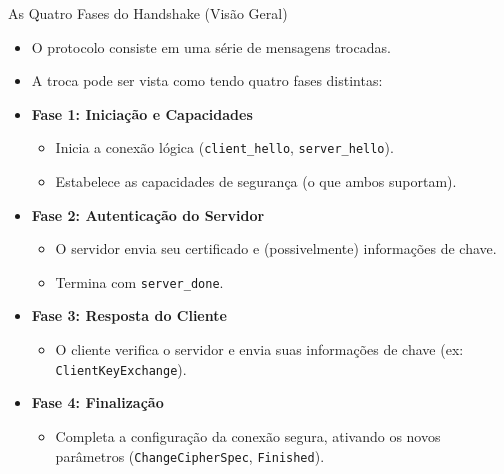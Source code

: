 \begin{frame}{As Quatro Fases do Handshake (Visão Geral)}
    \begin{itemize}
        \item O protocolo consiste em uma série de mensagens trocadas.
        \item A troca pode ser vista como tendo quatro fases distintas:

        \item \textbf{Fase 1: Iniciação e Capacidades}
              \begin{itemize}
                  \item Inicia a conexão lógica (\texttt{client\_hello}, \texttt{server\_hello}).
                  \item Estabelece as capacidades de segurança (o que ambos suportam).
              \end{itemize}

        \item \textbf{Fase 2: Autenticação do Servidor}
              \begin{itemize}
                  \item O servidor envia seu certificado e (possivelmente) informações de chave.
                  \item Termina com \texttt{server\_done}.
              \end{itemize}

        \item \textbf{Fase 3: Resposta do Cliente}
              \begin{itemize}
                  \item O cliente verifica o servidor e envia suas informações de chave (ex: \texttt{ClientKeyExchange}).
              \end{itemize}

        \item \textbf{Fase 4: Finalização}
              \begin{itemize}
                  \item Completa a configuração da conexão segura, ativando os novos parâmetros (\texttt{ChangeCipherSpec}, \texttt{Finished}).
              \end{itemize}
    \end{itemize}
\end{frame}

